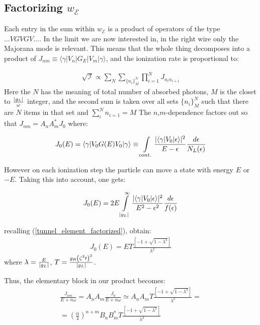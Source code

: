 \subsection{Factorizing $ w_\mathcal{E} $}
Each entry in the sum within $ w_{\mathcal{E}} $ is a product of operators of the type $ \dots VGVGV\dots. $ In the limit we are now interested in, in the right wire only the Majorana mode is relevant. This means that the whole thing decomposes into a product of $ J_{nm}\equiv\langle\gamma|V_{n}|G_{E}|V_{m}|\gamma\rangle $, and the ionization rate is proportional to:

\begin{gather}
	\sqrt{\mathcal{I}}\propto
	\sum_N \sum_{\{n_i\}_M^N}\prod_{i=1}^{N}J_{n_in_{i+1}}
\end{gather}
Here the $ N $ has the meaning of total number of absorbed photons, $ M $ is the closet to $ \frac{\left|g_L\right|}{\omega }$ integer, and the second sum is taken over all sets $ \{n_i\}_M^N $ such that there are $ N $ items in that set and $ \sum_i^N n_{i=1} = M$
 The $ n $,$ m $-dependence factors out so that $ J_{nm}=A_{n}A_{m}^{*}J_{0} $ where:

\begin{gather}
	J_{0}(E)=\langle\gamma|V_{0}G(E)V_{0}|\gamma\rangle\equiv\intop_{cont.}\frac{|\langle\gamma|V_{0}|\epsilon\rangle|^{2}}{E-\epsilon}\frac{d\epsilon}{N_L(\epsilon)}
\end{gather}

However on each ionization step  the particle can move a state with energy $ E $ or $ -E $. Taking this into account, one	 gets:

\begin{gather}
	J_{0}(E)
	=
	2E\intop_{|g_{L}|}^{\infty}\frac{|\langle\gamma|V_{0}|\epsilon\rangle|^{2}}{E^{2}-\epsilon^{2}}\frac{d\epsilon}{f(\epsilon)}
\end{gather}

recalling (\ref{tunnel_element_factorized}), obtain:
\begin{gather}
		J_{0}(E)
		=
		ET\frac{\left[-1+\sqrt{1-\lambda^{2}}\right]}{\lambda^{2}}
\end{gather}
where $ \lambda = \frac{E}{\left|g_L\right|} $, $ T=\frac{g_R\left(\zeta^2t\right)^2}{\left|g_L\right|} $.

Thus, the elementary block in our product becomes:
\begin{multline}
	\frac{J_{nm}}{E+n\omega}
	=
	A_{n}A_{m}\frac{J_{0}}{E+n\omega}\simeq A_{n}A_{m}T\frac{\left[-1+\sqrt{1-\lambda^{2}}\right]}{\lambda^{2}}
	=
	\\
	=\left(\frac{\alpha}{4}\right)^{n+m}B_{n}B_{m}^{*}T\frac{\left[-1+\sqrt{1-\lambda^{2}}\right]}{\lambda^{2}}
\end{multline}

